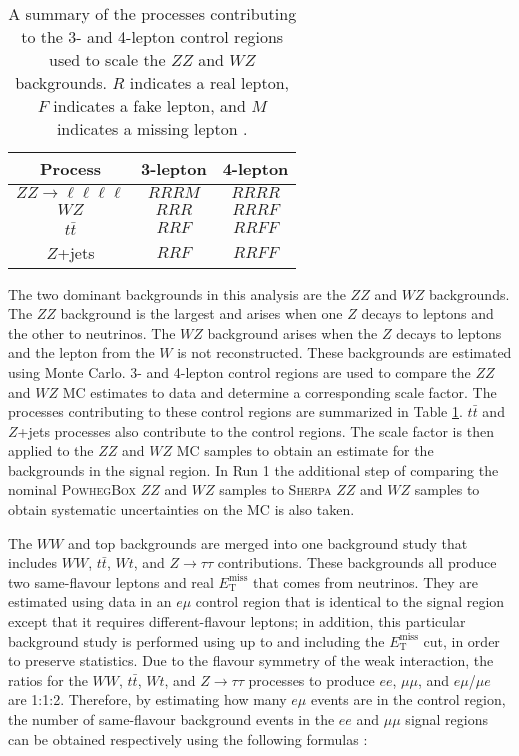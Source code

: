 \begin{table}[h]
\centering
\begin{tabular}{|c|c|c|}
\hline
Process                           & 3-lepton & 4-lepton \\ \hline \hline
$ZZ \rightarrow \ell\ell\ell\ell$ & $RRRM$     & $RRRR$     \\ \hline
$WZ$                              & $RRR$      & $RRRF$     \\ \hline \hline
$t \bar{t}$                       & $RRF$      & $RRFF$     \\ \hline
$Z$+jets                          & $RRF$      & $RRFF$     \\ \hline
\end{tabular}
\caption[A summary of the processes contributing to the 3- and 4-lepton control regions used to scale the $ZZ$ and $WZ$ backgrounds]{A summary of the processes contributing to the 3- and 4-lepton control regions used to scale the $ZZ$ and $WZ$ backgrounds. $R$ indicates a real lepton, $F$ indicates a fake lepton, and $M$ indicates a missing lepton \cite{Barberio:1529950}.}
\label{tbl:zzwz}
\end{table}

The two dominant backgrounds in this analysis are the $ZZ$ and $WZ$ backgrounds. The $ZZ$ background is the largest and arises when one $Z$ decays to leptons and the other to neutrinos. The $WZ$ background arises when the $Z$ decays to leptons and the lepton from the $W$ is not reconstructed. These backgrounds are estimated using Monte Carlo. 3- and 4-lepton control regions are used to compare the $ZZ$ and $WZ$ MC estimates to data and determine a corresponding scale factor. The processes contributing to these control regions are summarized in Table \ref{tbl:zzwz}. $t\bar{t}$ and $Z$+jets processes also contribute to the control regions. The scale factor is then applied to the $ZZ$ and $WZ$ MC samples to obtain an estimate for the backgrounds in the signal region. In Run 1 the additional step of comparing the nominal \textsc{PowhegBox} $ZZ$ and $WZ$ samples to \textsc{Sherpa} $ZZ$ and $WZ$ samples to obtain systematic uncertainties on the MC is also taken.

The $WW$ and top backgrounds are merged into one background study that includes $WW$, $t\bar{t}$, $Wt$, and $Z \rightarrow \tau\tau$ contributions. These backgrounds all produce two same-flavour leptons and real $E_\text{T}^\text{miss}$ that comes from neutrinos. They are estimated using data in an $e\mu$ control region that is identical to the signal region except that it requires different-flavour leptons; in addition, this particular background study is performed using up to and including the $E_\text{T}^\text{miss}$ cut, in order to preserve statistics. Due to the flavour symmetry of the weak interaction, the ratios for the $WW$, $t\bar{t}$, $Wt$, and $Z \rightarrow \tau\tau$ processes to produce $ee$, $\mu\mu$, and $e\mu$/$\mu e$ are 1:1:2. Therefore, by estimating how many $e\mu$ events are in the control region, the number of same-flavour background events in the $ee$ and $\mu\mu$ signal regions can be obtained respectively using the following formulas \cite{Barberio:1529950}:

